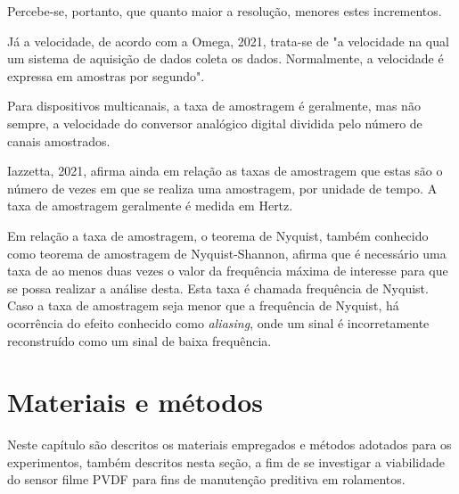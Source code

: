 \documentclass[
	12pt,				
	oneside,			
	a4paper,			
	english,			
	brazil,			
	]{abntex2ppgsi}
\begin{document}
Percebe-se, portanto, que quanto maior a resolução, menores estes incrementos. 

Já a velocidade, de acordo com a Omega, 2021, trata-se de "a velocidade na qual um sistema de aquisição de dados coleta os dados. Normalmente, a velocidade é expressa em amostras por segundo". 

Para dispositivos multicanais, a taxa de amostragem é geralmente, mas não sempre, a velocidade do conversor analógico digital dividida pelo número de canais amostrados. 

Iazzetta, 2021, afirma ainda em relação as taxas de amostragem que estas são o número de vezes em que se realiza uma amostragem, por unidade de tempo. A taxa de amostragem geralmente é medida em Hertz. 



Em relação a taxa de amostragem, o teorema de Nyquist, também conhecido como teorema de amostragem de Nyquist-Shannon, afirma que é necessário uma taxa de ao menos duas vezes o valor da frequência máxima de interesse para que se possa realizar a análise desta. Esta taxa é chamada frequência de Nyquist. Caso a taxa de amostragem seja menor que a frequência de Nyquist, há ocorrência do efeito conhecido como \textit{aliasing}, onde um sinal é incorretamente reconstruído como um sinal de baixa frequência.




\chapter{Materiais e métodos}
\label{secao:MateriaisEMetodos}

Neste capítulo são descritos os materiais empregados e métodos adotados para os experimentos, também descritos nesta seção, a fim de se investigar a viabilidade do sensor filme PVDF para fins de manutenção preditiva em rolamentos. 
\end{document}

